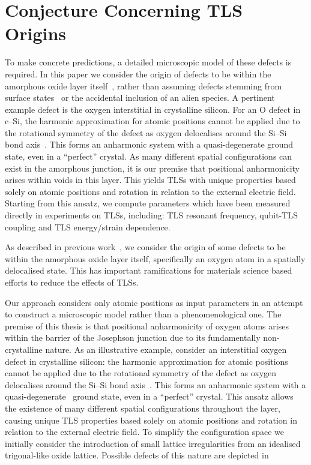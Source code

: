 \section{Conjecture Concerning TLS Origins}

To make concrete predictions, a detailed microscopic model of these defects is required.
In this paper we consider the origin of defects to be within the amorphous oxide layer itself~\cite{Lacquaniti2012}, rather than assuming defects stemming from surface states~\cite{Choi2009} or the accidental inclusion of an alien species.
A pertinent example defect is the oxygen interstitial in crystalline silicon. For an O defect in c--Si, the harmonic approximation for atomic positions cannot be applied due to the rotational symmetry of the defect as oxygen delocalises around the Si--Si bond axis~\cite{Artacho1995}.
This forms an anharmonic system with a quasi-degenerate ground state, even in a ``perfect'' crystal.
As many different spatial configurations can exist in the  amorphous junction, it is our premise that positional anharmonicity arises within voids in this layer.
This yields TLSs with unique properties based solely on atomic positions and rotation in relation to the external electric field.
Starting from this ansatz, we compute parameters which have been measured directly in experiments on TLSs, including: TLS resonant frequency, qubit-TLS coupling and TLS energy/strain dependence.


As described in previous work~\cite{DuBois2013}, we consider the origin of some defects to be within the amorphous oxide layer itself, specifically an oxygen atom in a spatially delocalised state.
This has important ramifications for materials science based efforts to reduce the effects of TLSs.


Our approach considers only atomic positions as input parameters in an attempt to construct a microscopic model rather than a phenomenological one.
The premise of this thesis is that positional anharmonicity of oxygen atoms arises within the  barrier of the Josephson junction due to its fundamentally non-crystalline nature.
As an illustrative example, consider an interstitial oxygen defect in crystalline silicon: the harmonic approximation for atomic positions cannot be applied due to the rotational symmetry of the defect as oxygen delocalises around the Si--Si bond axis~\cite{Artacho1995}.
This forms an anharmonic system with a quasi-degenerate~\cite{DuBois2013} ground state, even in a ``perfect'' crystal.
This ansatz allows the existence of many different spatial configurations throughout the layer, causing unique TLS properties based solely on atomic positions and rotation in relation to the external electric field.
To simplify the configuration space we initially consider the introduction of small lattice irregularities from an idealised trigonal-like  oxide lattice.
Possible defects of this nature are depicted in %

